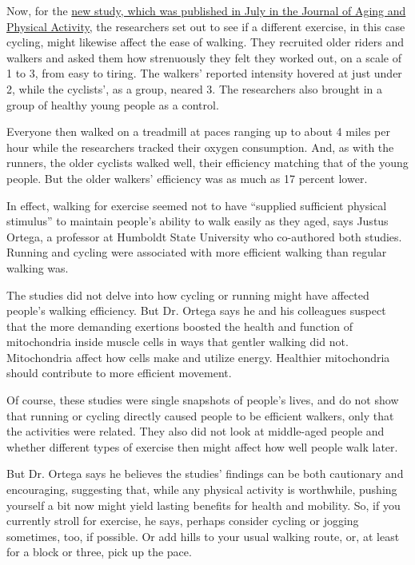 Now, for the \href{https://pubmed.ncbi.nlm.nih.gov/32723930/}{new study,
which was published in July in the Journal of Aging and Physical
Activity,} the researchers set out to see if a different exercise, in
this case cycling, might likewise affect the ease of walking. They
recruited older riders and walkers and asked them how strenuously they
felt they worked out, on a scale of 1 to 3, from easy to tiring. The
walkers' reported intensity hovered at just under 2, while the
cyclists', as a group, neared 3. The researchers also brought in a group
of healthy young people as a control.

Everyone then walked on a treadmill at paces ranging up to about 4 miles
per hour while the researchers tracked their oxygen consumption. And, as
with the runners, the older cyclists walked well, their efficiency
matching that of the young people. But the older walkers' efficiency was
as much as 17 percent lower.

In effect, walking for exercise seemed not to have ``supplied sufficient
physical stimulus'' to maintain people's ability to walk easily as they
aged, says Justus Ortega, a professor at Humboldt State University who
co-authored both studies. Running and cycling were associated with more
efficient walking than regular walking was.

The studies did not delve into how cycling or running might have
affected people's walking efficiency. But Dr. Ortega says he and his
colleagues suspect that the more demanding exertions boosted the health
and function of mitochondria inside muscle cells in ways that gentler
walking did not. Mitochondria affect how cells make and utilize energy.
Healthier mitochondria should contribute to more efficient movement.

Of course, these studies were single snapshots of people's lives, and do
not show that running or cycling directly caused people to be efficient
walkers, only that the activities were related. They also did not look
at middle-aged people and whether different types of exercise then might
affect how well people walk later.

But Dr. Ortega says he believes the studies' findings can be both
cautionary and encouraging, suggesting that, while any physical activity
is worthwhile, pushing yourself a bit now might yield lasting benefits
for health and mobility. So, if you currently stroll for exercise, he
says, perhaps consider cycling or jogging sometimes, too, if possible.
Or add hills to your usual walking route, or, at least for a block or
three, pick up the pace.

